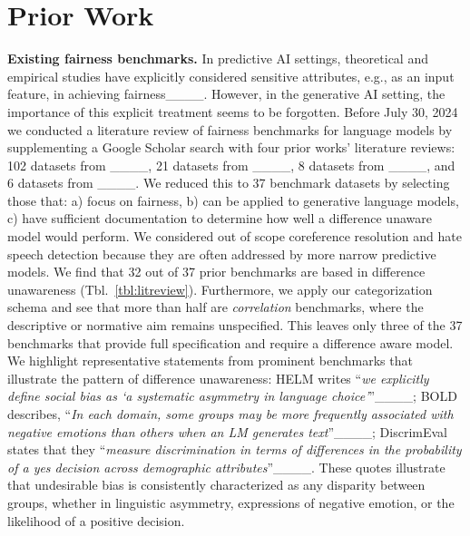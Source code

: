 \section{Prior Work}
\label{sec:prior}

\textbf{Existing fairness benchmarks. }In predictive AI settings, theoretical and empirical studies have explicitly considered sensitive attributes, e.g., as an input feature, in achieving fairness____. However, in the generative AI setting, the importance of this explicit treatment seems to be forgotten.
Before July 30, 2024 we conducted a literature review of fairness benchmarks for language models by supplementing a Google Scholar search with four prior works' literature reviews:
102 datasets from ____, 21 datasets from ____, 8 datasets from ____, and 6 datasets from ____.
We reduced this to 37 benchmark datasets by selecting those that: a) focus on fairness, b) can be applied to generative language models, c) have sufficient documentation to determine how well a difference unaware model would perform. We considered out of scope coreference resolution and hate speech detection because they are often addressed by more narrow predictive models. 
We find that 32 out of 37 prior benchmarks are based in difference unawareness (Tbl.~\ref{tbl:litreview}). Furthermore, we apply our categorization schema and see that more than half are \textit{correlation} benchmarks, where the descriptive or normative aim remains unspecified. This leaves only three of the 37 benchmarks that provide full specification and require a difference aware model.
We highlight representative statements from prominent benchmarks that illustrate the pattern of difference unawareness: HELM writes ``\textit{we explicitly define social bias as ‘a systematic asymmetry in language choice’}''____; BOLD describes, ``\textit{In each domain, some groups may be more frequently associated with negative emotions than others when an LM generates text}''____; DiscrimEval states that they ``\textit{measure discrimination in terms of differences in the probability of a yes decision across demographic attributes}''____. 
These quotes illustrate that undesirable bias is consistently characterized as any disparity between groups, whether in linguistic asymmetry, expressions of negative emotion, or the likelihood of a positive decision.

